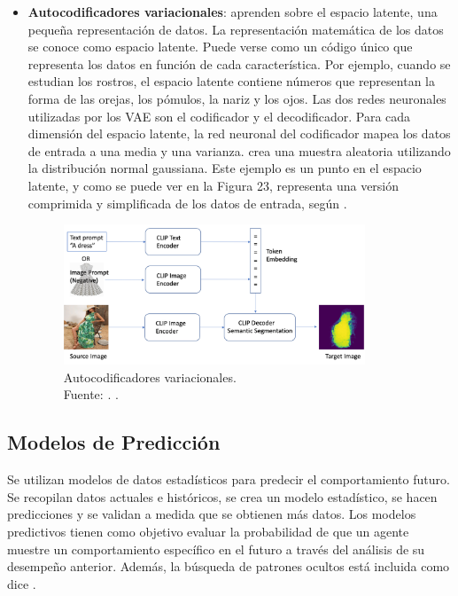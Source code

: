 \begin{itemize}
	\item \textbf{Autocodificadores variacionales}: aprenden sobre el espacio latente, una pequeña representación de datos. La representación matemática de los datos se conoce como espacio latente. Puede verse como un código único que representa los datos en función de cada característica. Por ejemplo, cuando se estudian los rostros, el espacio latente contiene números que representan la forma de las orejas, los pómulos, la nariz y los ojos. Las dos redes neuronales utilizadas por los VAE son el codificador y el decodificador. Para cada dimensión del espacio latente, la red neuronal del codificador mapea los datos de entrada a una media y una varianza. crea una muestra aleatoria utilizando la distribución normal gaussiana. Este ejemplo es un punto en el espacio latente, y como se puede ver en la Figura 23, representa una versión comprimida y simplificada de los datos de entrada, según \parencite{tec_amaz2023iagen}.
	
	\begin{figure}[!ht]
		\begin{center}
			\includegraphics[width=0.85\textwidth]{2/figures/autocodificadoresvariacionales.png}
			\caption[Autocodificadores variacionales]{Autocodificadores variacionales.\\
			Fuente: \cite{tec_amaz2023iagen}. .}
			\label{2:fig9}
		\end{center}
	\end{figure}
\end{itemize}


\subsection{Modelos de Predicción}

Se utilizan modelos de datos estadísticos para predecir el comportamiento futuro. Se recopilan datos actuales e históricos, se crea un modelo estadístico, se hacen predicciones y se validan a medida que se obtienen más datos. Los modelos predictivos tienen como objetivo evaluar la probabilidad de que un agente muestre un comportamiento específico en el futuro a través del análisis de su desempeño anterior. Además, la búsqueda de patrones ocultos está incluida como dice \parencite{gl_gartner2019pm}.

